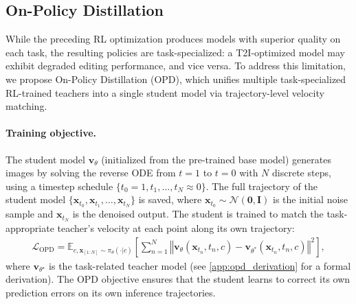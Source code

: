 \documentclass{article} %
\renewcommand{\mathbf}[1]{\bm{#1}}
\begin{document}
\subsection{On-Policy Distillation}
\label{sec:opd}

While the preceding RL optimization produces models with superior quality on each task, the resulting policies are task-specialized: a T2I-optimized model may exhibit degraded editing performance, and vice versa. To address this limitation, we propose On-Policy Distillation (OPD), which unifies multiple task-specialized RL-trained teachers into a single student model via trajectory-level velocity matching.

\paragraph{Training objective.} The student model $\mathbf{v}_\theta$ (initialized from the pre-trained base model) generates images by solving the reverse ODE from $t=1$ to $t=0$ with $N$ discrete steps, using a timestep schedule $\{t_0 = 1, t_1, \ldots, t_N \approx 0\}$. The full trajectory of the student model $\{\mathbf{x}_{t_0}, \mathbf{x}_{t_1}, \ldots, \mathbf{x}_{t_N}\}$ is saved, where $\mathbf{x}_{t_0} \sim \mathcal{N}(\mathbf{0}, \mathbf{I})$ is the initial noise sample and $\mathbf{x}_{t_N}$ is the denoised output. The student is trained to match the task-appropriate teacher's velocity at each point along its own trajectory:
\begin{align}
    \mathcal{L}_{\text{OPD}} = \mathbb{E}_{c,\mathbf{x}_{[1:N]}\sim \pi_\theta(\cdot|c)}\left[\sum_{n =1}^N \left\Vert \mathbf{v}_\theta(\mathbf{x}_{t_n}, t_n,c) - \mathbf{v}_{\theta^*}(\mathbf{x}_{t_n}, t_n,c) \right\Vert^2\right],
    \label{eq:opd_loss}
\end{align}
where $\mathbf{v}_{\theta^\star}$ is the task-related teacher model (see \cref{app:opd_derivation} for a formal derivation). The OPD objective ensures that the student learns to correct its own prediction errors on its own inference trajectories.
\end{document}
